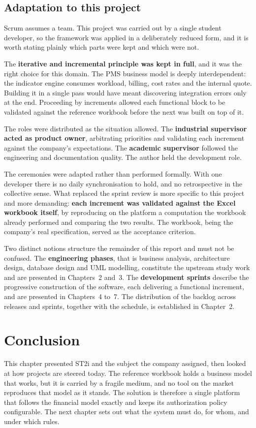 \subsection{Adaptation to this project}
\label{sec:scrum-adapt}
Scrum assumes a team. This project was carried out by a single student developer, so the framework
was applied in a deliberately reduced form, and it is worth stating plainly which parts were kept
and which were not.

The \textbf{iterative and incremental principle was kept in full}, and it was the right choice for
this domain. The PMS business model is deeply interdependent: the indicator engine consumes
workload, billing, cost rates and the internal quote. Building it in a single pass would have meant
discovering integration errors only at the end. Proceeding by increments allowed each functional
block to be validated against the reference workbook before the next was built on top of it.

The roles were distributed as the situation allowed. The \textbf{industrial supervisor acted as
product owner}, arbitrating priorities and validating each increment against the company's
expectations. The \textbf{academic supervisor} followed the engineering and documentation quality.
The author held the development role.

The ceremonies were adapted rather than performed formally. With one developer there is no daily
synchronisation to hold, and no retrospective in the collective sense. What replaced the sprint
review is more specific to this project and more demanding: \textbf{each increment was validated
against the Excel workbook itself}, by reproducing on the platform a computation the workbook
already performed and comparing the two results. The workbook, being the company's real
specification, served as the acceptance criterion.

Two distinct notions structure the remainder of this report and must not be confused. The
\textbf{engineering phases}, that is business analysis, architecture design, database design and
UML modelling, constitute the upstream study work and are presented in Chapters~2 and~3. The
\textbf{development sprints} describe the progressive construction of the software, each delivering
a functional increment, and are presented in Chapters~4 to~7. The distribution of the backlog across
releases and sprints, together with the schedule, is established in Chapter~2.

\section*{Conclusion}
This chapter presented ST2i and the subject the company assigned, then looked at how projects are
steered today. The reference workbook holds a business model that works, but it is carried by a
fragile medium, and no tool on the market reproduces that model as it stands. The solution is
therefore a single platform that follows the financial model exactly and keeps its authorization
policy configurable. The next chapter sets out what the system must do, for whom, and under which
rules.
